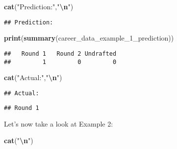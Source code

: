 \documentclass[
]{article}
\newenvironment{Shaded}{\begin{snugshade}}{\end{snugshade}}
\newcommand{\FunctionTok}[1]{\textcolor[rgb]{0.13,0.29,0.53}{\textbf{#1}}}
\newcommand{\NormalTok}[1]{#1}
\newcommand{\SpecialCharTok}[1]{\textcolor[rgb]{0.81,0.36,0.00}{\textbf{#1}}}
\newcommand{\StringTok}[1]{\textcolor[rgb]{0.31,0.60,0.02}{#1}}
\begin{document}
\begin{Shaded}
\begin{Highlighting}[]
\FunctionTok{cat}\NormalTok{(}\StringTok{"Prediction:"}\NormalTok{,}\StringTok{"}\SpecialCharTok{\textbackslash{}n}\StringTok{"}\NormalTok{)}
\end{Highlighting}
\end{Shaded}

\begin{verbatim}
## Prediction:
\end{verbatim}

\begin{Shaded}
\begin{Highlighting}[]
\FunctionTok{print}\NormalTok{(}\FunctionTok{summary}\NormalTok{(career\_data\_example\_1\_prediction))}
\end{Highlighting}
\end{Shaded}

\begin{verbatim}
##   Round 1   Round 2 Undrafted 
##         1         0         0
\end{verbatim}

\begin{Shaded}
\begin{Highlighting}[]
\FunctionTok{cat}\NormalTok{(}\StringTok{"Actual:"}\NormalTok{,}\StringTok{"}\SpecialCharTok{\textbackslash{}n}\StringTok{"}\NormalTok{)}
\end{Highlighting}
\end{Shaded}

\begin{verbatim}
## Actual:
\end{verbatim}

\begin{Shaded}
\end{Shaded}

\begin{verbatim}
## Round 1
\end{verbatim}

Let's now take a look at Example 2:

\begin{Shaded}
\begin{Highlighting}[]
\FunctionTok{cat}\NormalTok{(}\StringTok{"}\SpecialCharTok{\textbackslash{}n}\StringTok{"}\NormalTok{)}
\end{Highlighting}
\end{Shaded}
\end{document}
